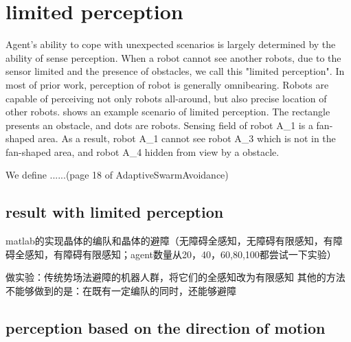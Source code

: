 \section{limited perception}

Agent's ability to cope with unexpected scenarios is largely determined by the ability of sense perception\cite{Distributed adaptive swarm for obstacle avoidance}. 
When a robot cannot see another robots, due to the sensor limited and the presence of obstacles, we call this "limited perception".
In most of prior work, perception of robot is generally omnibearing. 
Robots are capable of perceiving not only robots all-around, but also precise location of other robots\cite{}.
\figurename{} shows an example scenario of  limited perception. The rectangle presents an obstacle, and dots are robots. 
Sensing field of robot A_1 is a fan-shaped area. As a result, robot A_1 cannot see robot A_3 which is not in the fan-shaped area, and robot A_4 hidden from view by a obstacle.

We define ......(page 18 of AdaptiveSwarmAvoidance)

\subsection{result with limited perception}

matlab的实现晶体的编队和晶体的避障（无障碍全感知，无障碍有限感知，有障碍全感知，有障碍有限感知；agent数量从20，40，60,80,100都尝试一下实验）

做实验：传统势场法避障的机器人群，将它们的全感知改为有限感知
其他的方法不能够做到的是：在既有一定编队的同时，还能够避障
\subsection{perception based on the direction of motion}
